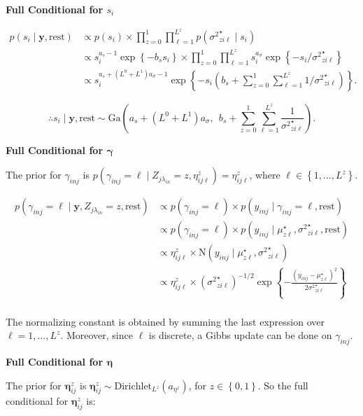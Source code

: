 \documentclass[12pt,]{article}
\newcommand{\p}[1]{\left(#1\right)}
\newcommand{\bc}[1]{ \left\{#1\right\} }
\newcommand{\N}{ \mathcal{N} }
\def\N{\text{N}}
\def\G{\text{Ga}}
\def\Dir{\text{Dirichlet}}
\def\lin{\lambda_{in}}
\def\y{\bm{y}}
\def\mus{\mu^\star}
\def\sss{{\sigma^2}^\star}
\def\rest{\text{rest}}
\begin{document}
\textbf{Full Conditional for $s_i$}

\begin{align*}
p(s_i \mid \y, \rest) &\propto p(s_i) \times \prod_{z=0}^1 \prod_{\ell=1}^{L^z}
  p(\sss_{zi\ell} \mid s_i)\\
&\propto s_i^{a_s-1} \exp\bc{-b_s s_i} \times \prod_{z=0}^1
  \prod_{\ell=1}^{L^z} s_i^{a_\sigma} \exp\bc{-s_i / \sss_{zi\ell}} \\
&\propto s_i^{a_s + (L^0 + L^1)a_\sigma - 1} \exp\bc{-s_i \p{b_s + \sum_{z=0}^1
\sum_{\ell=1}^{L^z} 1 / \sss_{zi\ell}}}.
\end{align*}

\[
\therefore s_i \mid \y, \rest \sim 
\G\p{a_s + (L^0 + L^1)a_\sigma, ~~ b_s + \sum_{z=0}^1 \sum_{\ell=1}^{L^z}
\frac{1}{\sss_{zi\ell}} }.
\]
\vspace{2em}


\textbf{Full Conditional for $\bm\gamma$}

The prior for \(\gamma_{inj}\) is
\(p(\gamma_{inj} = \ell \mid Z_{j\lin}=z, \eta^z_{ij\ell}) = \eta^z_{ij\ell}\),
where \(\ell \in \bc{1,...,L^z}\).

\begin{align*}
p(\gamma_{inj}=\ell \mid \y, Z_{j\lin}=z, \rest) &\propto p(\gamma_{inj}=\ell)
  \times p(y_{inj} \mid \gamma_{inj}=\ell, \rest) \\
&\propto p(\gamma_{inj}=\ell) \times p(y_{inj} \mid \mus_{z\ell},
  \sss_{zi\ell}, \rest) \\
%
&\propto \eta^z_{ij\ell} \times \N(y_{inj} \mid \mus_{z\ell}, \sss_{zi\ell}) \\
&\propto \eta^z_{ij\ell} \times (\sss_{zi\ell})^{-1/2}
\exp\bc{-\frac{(y_{inj} - \mus_{z\ell})^2}{2\sss_{zi\ell}}} \\
\end{align*}

The normalizing constant is obtained by summing the last expression over
\(\ell = 1,...,L^z\). Moreover, since \(\ell\) is discrete, a Gibbs
update can be done on \(\gamma_{inj}\).
\vspace{2em}


\textbf{Full Conditional for $\bm\eta$}

The prior for \(\bm\eta^z_{ij}\) is
\(\bm \eta^z_{ij} \sim \Dir_{L^z}(a_{\eta^z})\), for \(z\in\bc{0,1}\).
So the full conditional for \(\bm\eta^z_{ij}\) is:
\end{document}
